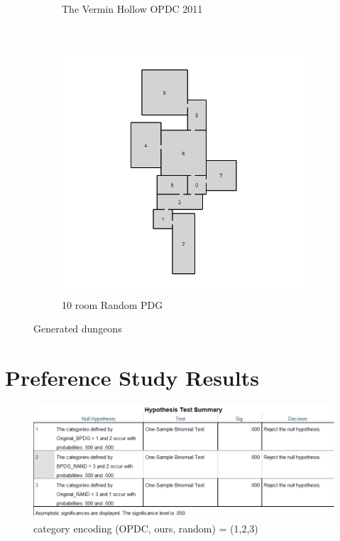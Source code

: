\documentclass{UoYCSproject}
\begin{document}
\begin{figure}[htb]
\begin{subfigure}[b]{0.45\textwidth}
    \caption{The Vermin Hollow OPDC 2011}
  \end{subfigure}
  ~
  \begin{subfigure}[b]{0.45\textwidth}
    \centering
    \includegraphics[width=\textwidth]{figures/generated/RAND_10_6.jpg}
    \caption{10 room Random PDG}
  \end{subfigure}
  \caption{Generated dungeons}
  \label{fig:gen_dungeons}
\end{figure}

\section{Preference Study Results}
\label{app:preference_study_results}

\begin{figure}[htb]
  \centering
  \includegraphics[width=\textwidth]{ExternalValidation/hypothesis_test_summary.png}
  \caption{category encoding (OPDC, ours, random) = (1,2,3)}
  \label{fig:binomial_test_summary}
\end{figure}
\end{document}

